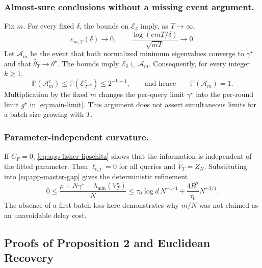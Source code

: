 \documentclass[10pt,twoside,letterpaper]{article}
\newcommand{\Prob}{\mathbb P}
\newcommand{\Vhat}{\widehat V}
\newcommand{\gstar}{g^\star}
\begin{document}
\subsubsection*{Almost-sure conclusions without a missing event argument.}
Fix $m$. For every fixed $\delta$, the bounds on $\mathcal E_\delta$
imply, as $T\to\infty$,
\begin{equation}
\varepsilon_{m,T}(\delta)\to0,\qquad
\frac{\log(emT/\delta)}{\sqrt{mT}}\to0.
\label{eq:app-deterministic-rate-limits}
\end{equation}
Let $\mathcal A_m$ be the event that both normalized minimum eigenvalues
converge to $\gamma^\star$ and that $\widehat\theta_T\to\theta^\star$.
The bounds imply $\mathcal E_\delta\subseteq\mathcal A_m$.
Consequently, for every integer $k\ge1$,
\begin{equation}
\Prob(\mathcal A_m^c)
\le\Prob(\mathcal E_{2^{-k}}^c)\le2^{-k-1},
\qquad\text{and hence}\qquad\Prob(\mathcal A_m)=1.
\label{eq:app-probability-one}
\end{equation}
Multiplication by the fixed $m$ changes the per-query limit
$\gamma^\star$ into the per-round limit $\gstar$ in
\eqref{eq:main-limit}. This argument does not assert simultaneous
limits for a batch size growing with $T$.

\subsubsection*{Parameter-independent curvature.}
If $C_F=0$, \eqref{eq:app-fisher-lipschitz} shows that the information
is independent of the fitted parameter. Then $\ell_{t,j}=0$ for all
queries and $\Vhat_T=Z_N$. Substituting into
\eqref{eq:app-master-gap} gives the deterministic refinement
\begin{equation}
0\le\frac{\rho+N\gamma^\star-\lambda_{\min}(V_T^\star)}N
\le\tau_0\log d\,N^{-1/4}
+\frac{4B^2}{\tau_0}N^{-3/4}.
\label{eq:app-known-curvature}
\end{equation}
The absence of a first-batch loss here demonstrates why $m/N$ was not
claimed as an unavoidable delay cost.

\subsection{Proofs of Proposition 2 and Euclidean Recovery}
\label{app:confidence}
\end{document}
